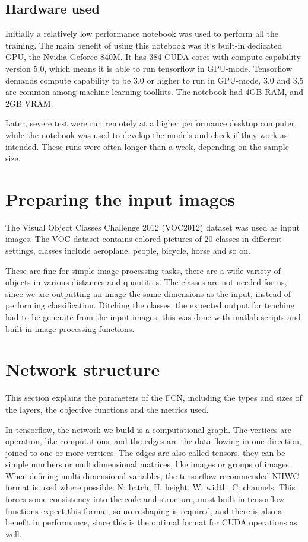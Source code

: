 \documentclass[12pt]{report}
\begin{document}
\subsection{Hardware used}
Initially a relatively low performance notebook was used to perform all the training. The main benefit of using this notebook was it's built-in dedicated GPU, the Nvidia Geforce 840M. It has 384 CUDA cores with compute capability version 5.0, which means it is able to run tensorflow in GPU-mode. Tensorflow demands compute capability to be 3.0 or higher to run in GPU-mode, 3.0 and 3.5 are common among machine learning toolkits. The notebook had 4GB RAM, and 2GB VRAM.\par
Later, severe test were run remotely at a higher performance desktop computer, while the notebook was used to develop the models and check if they work as intended. These runs were often longer than a week, depending on the sample size.
\section{Preparing the input images}
The Visual Object Classes Challenge 2012 (VOC2012) dataset was used as input images. The VOC dataset contains colored pictures of 20 classes in different settings, classes include aeroplane, people, bicycle, horse and so on.\par
These are fine for simple image processing tasks, there are a wide variety of objects in various distances and quantities. The classes are not needed for us, since we are outputting an image the same dimensions as the input, instead of performing classification. Ditching the classes, the expected output for teaching had to be generate from the input images, this was done with matlab scripts and built-in image processing functions.
\section{Network structure}
This section explains the parameters of the FCN, including the types and sizes of the layers, the objective functions and the metrics used.\par
In tensorflow, the network we build is a computational graph. The vertices are operation, like computations, and the edges are the data flowing in one direction, joined to one or more vertices. The edges are also called tensors, they can be simple numbers or multidimensional matrices, like images or groups of images.
When defining multi-dimensional variables, the tensorflow-recommended NHWC format is used where possible: N: batch, H: height, W: width, C: channels. This forces some consistency into the code and structure, most built-in tensorflow functions expect this format, so no reshaping is required, and there is also a benefit in performance, since this is the optimal format for CUDA operations as well.
\end{document}
